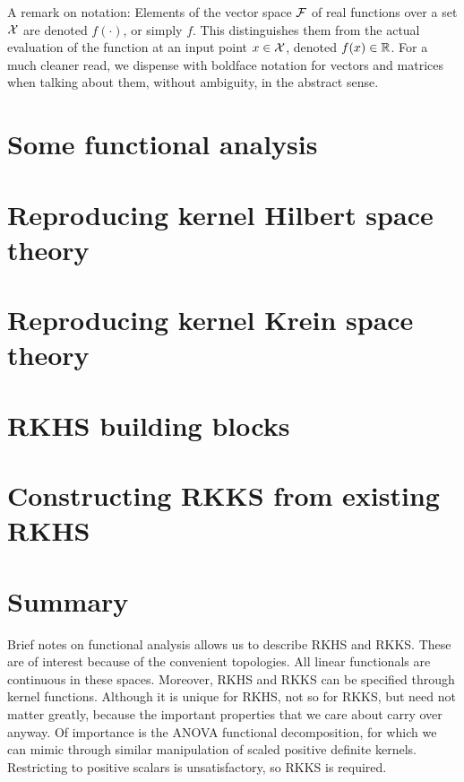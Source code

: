 \documentclass[a4paper,showframe,11pt,draft]{report}
\begin{document}
A remark on notation: Elements of the vector space ${\mathcal F}$ of real functions over a set ${\mathcal X}$ are denoted $f(\cdot)$, or simply $f$.
This distinguishes them from the actual evaluation of the function at an input point $x \in {\mathcal X}$, denoted $f(x) \in \mathbb{R}$.
For a much cleaner read, we dispense with boldface notation for vectors and matrices when talking about them, without ambiguity, in the abstract sense. 

\section{Some functional analysis}


\section{Reproducing kernel Hilbert space theory}\label{sec:rkhstheory}


\section{Reproducing kernel Krein space theory}


\section{RKHS building blocks}


\section{Constructing RKKS from existing RKHS}


\section{Summary}

Brief notes on functional analysis allows us to describe RKHS and RKKS.
These are of interest because of the convenient topologies.
All linear functionals are continuous in these spaces.
Moreover, RKHS and RKKS can be specified through kernel functions.
Although it is unique for RKHS, not so for RKKS, but need not matter greatly, because the important properties that we care about carry over anyway.
Of importance is the ANOVA functional decomposition, for which we can mimic through similar manipulation of scaled positive definite kernels.
Restricting to positive scalars is unsatisfactory, so RKKS is required.


\hClosingStuffStandalone
\end{document}
